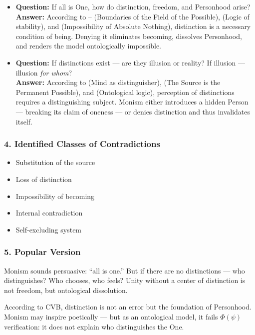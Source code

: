 \documentclass[12pt]{article}
\begin{document}
\begin{itemize}
\item \textbf{Question:} If all is One, how do distinction, freedom, and Personhood arise?  
\\ \textbf{Answer:} According to \text{[4.1]}–\text{[4.4]} (Boundaries of the Field of the Possible), \text{[11.1]} (Logic of stability), and \text{[1]} (Impossibility of Absolute Nothing), distinction is a necessary condition of being. Denying it eliminates becoming, dissolves Personhood, and renders the model ontologically impossible.

\item \textbf{Question:} If distinctions exist — are they illusion or reality? If illusion — illusion \emph{for whom}?  
\\ \textbf{Answer:} According to \text{[10.2]} (Mind as distinguisher), \text{[6]} (The Source is the Permanent Possible), and \text{[11.1]} (Ontological logic), perception of distinctions requires a distinguishing subject. Monism either introduces a hidden Person — breaking its claim of oneness — or denies distinction and thus invalidates itself.
\end{itemize}

\subsubsection*{4. Identified Classes of Contradictions}

\begin{itemize}
\item Substitution of the source
\item Loss of distinction
\item Impossibility of becoming
\item Internal contradiction
\item Self-excluding system
\end{itemize}

\subsubsection*{5. Popular Version}

Monism sounds persuasive: ``all is one.'' But if there are no distinctions — who distinguishes? Who chooses, who feels? Unity without a center of distinction is not freedom, but ontological dissolution.

According to CVB, distinction is not an error but the foundation of Personhood. Monism may inspire poetically — but as an ontological model, it fails $\Phi(\psi)$ verification: it does not explain who distinguishes the One.
\end{document}

